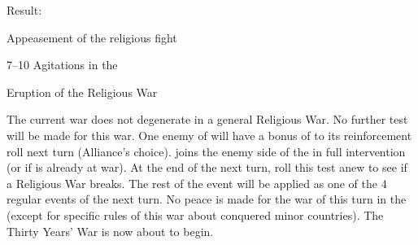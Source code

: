\aparag Result:\par
\begin{modlist}
\item[\geq 11] Appeasement of the religious fight
\item[7--10] Agitations in the \HRE
\item[\leq 6] Eruption of the Religious War
\end{modlist}
 The current war does not
degenerate in a general Religious War. No further test will be made for this
war.
\bparag One \MIN enemy of \HAB will have a bonus of  to its
reinforcement roll next turn (Alliance's choice).
\bparag \paysSaxe joins the enemy side of the \HAB in full intervention (or
\paysBrandebourg if \paysSaxe is already at war).
\bparag At the end of the next turn, roll this test anew to see if a Religious
War breaks.
 The rest of the event will be applied
as one of the 4 regular events of the next turn.  No peace is made for the war
of this turn in the \HRE (except for specific rules of this war about
conquered minor countries).  The Thirty Years' War is now about to begin.

